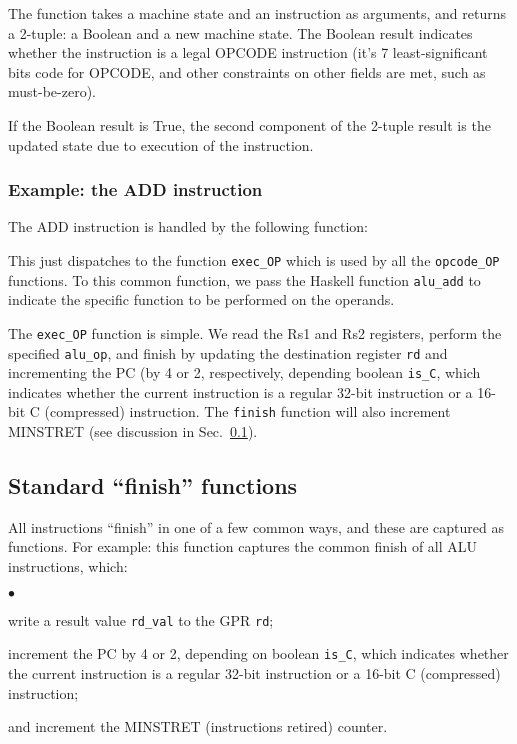 \documentclass[11pt]{article}
\newenvironment{tightlist}%
{\begin{list}{$\bullet$}{%
    \setlength{\topsep}{0in}
    \setlength{\partopsep}{0in}
    \setlength{\itemsep}{0in}
    \setlength{\parsep}{0in}
    \setlength{\leftmargin}{1.5em}
    \setlength{\rightmargin}{0in}
    \setlength{\itemindent}{0in}
}
}%
{\end{list}
}
\begin{document}
The function takes a machine state and an instruction as arguments,
and returns a 2-tuple: a Boolean and a new machine state.  The Boolean
result indicates whether the instruction is a legal OPCODE instruction
(it's 7 least-significant bits code for OPCODE, and other constraints
on other fields are met, such as must-be-zero).

If the Boolean result is True, the second component of the 2-tuple
result is the updated state due to execution of the instruction.

\subsubsection{Example: the ADD instruction}

The ADD instruction is handled by the following function:



This just dispatches to the function \verb|exec_OP| which is used by
all the \verb|opcode_OP| functions.  To this common function, we pass
the Haskell function \verb|alu_add| to indicate the specific function
to be performed on the operands.

The \verb|exec_OP| function is simple.  We read the Rs1 and Rs2
registers, perform the specified \verb|alu_op|, and finish by updating
the destination register \verb|rd| and incrementing the PC (by 4 or 2,
respectively, depending boolean \verb|is_C|, which indicates whether
the current instruction is a regular 32-bit instruction or a 16-bit C
(compressed) instruction.  The \verb|finish| function will also
increment MINSTRET (see discussion in
Sec.~\ref{sec_standard_finish_functions}).




\subsection{Standard ``finish'' functions}

\label{sec_standard_finish_functions}

All instructions ``finish'' in one of a few common ways, and these are
captured as functions.  For example: this function captures the common
finish of all ALU instructions, which:
\begin{tightlist}

\item write a result value \verb|rd_val| to the GPR \verb|rd|;

\item increment the PC by 4 or 2, depending on boolean \verb|is_C|,
which indicates whether the current instruction is a regular 32-bit
instruction or a 16-bit C (compressed) instruction;

\item and increment the MINSTRET (instructions retired) counter.

\end{tightlist}
\end{document}

